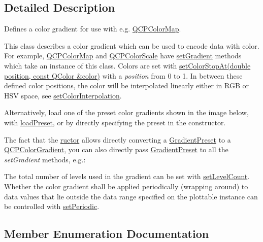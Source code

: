 \subsection{Detailed Description}
Defines a color gradient for use with e.\+g. \hyperlink{classQCPColorMap}{Q\+C\+P\+Color\+Map}. 

This class describes a color gradient which can be used to encode data with color. For example, \hyperlink{classQCPColorMap}{Q\+C\+P\+Color\+Map} and \hyperlink{classQCPColorScale}{Q\+C\+P\+Color\+Scale} have \hyperlink{classQCPColorMap_a7313c78360471cead3576341a2c50377}{set\+Gradient} methods which take an instance of this class. Colors are set with \hyperlink{classQCPColorGradient_a3b48be5e78079db1bb2a1188a4c3390e}{set\+Color\+Stop\+At(double position, const Q\+Color \&color)} with a {\itshape position} from 0 to 1. In between these defined color positions, the color will be interpolated linearly either in R\+GB or H\+SV space, see \hyperlink{classQCPColorGradient_aa13fda86406e1d896a465a409ae63b38}{set\+Color\+Interpolation}.

Alternatively, load one of the preset color gradients shown in the image below, with \hyperlink{classQCPColorGradient_aa0aeec1528241728b9671bf8e60b1622}{load\+Preset}, or by directly specifying the preset in the constructor.



The fact that the \hyperlink{classQCPColorGradient}{ructor} allows directly converting a \hyperlink{classQCPColorGradient_aed6569828fee337023670272910c9072}{Gradient\+Preset} to a \hyperlink{classQCPColorGradient}{Q\+C\+P\+Color\+Gradient}, you can also directly pass \hyperlink{classQCPColorGradient_aed6569828fee337023670272910c9072}{Gradient\+Preset} to all the {\itshape set\+Gradient} methods, e.\+g.\+: 
\begin{DoxyCodeInclude}
\end{DoxyCodeInclude}
 The total number of levels used in the gradient can be set with \hyperlink{classQCPColorGradient_a18da587eb4f7fc788ea28ba15b6a12de}{set\+Level\+Count}. Whether the color gradient shall be applied periodically (wrapping around) to data values that lie outside the data range specified on the plottable instance can be controlled with \hyperlink{classQCPColorGradient_a39d6448155fc00a219f239220d14bb39}{set\+Periodic}. 

\subsection{Member Enumeration Documentation}
